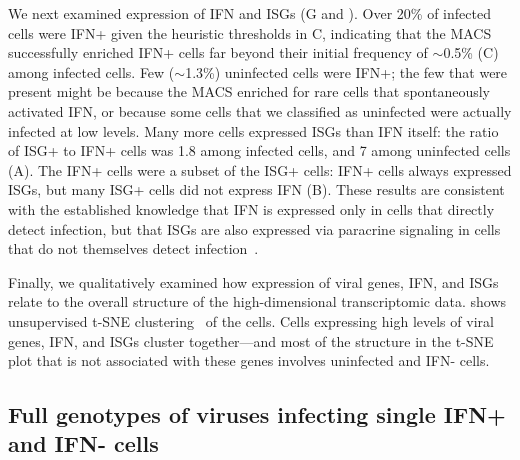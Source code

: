 \documentclass[9pt,lineno]{elife}
\begin{document}
We next examined expression of IFN and ISGs (G and ).
Over 20\% of  infected cells were IFN+ given the heuristic thresholds in C, indicating that the MACS successfully enriched IFN+ cells far beyond their initial frequency of $\sim$0.5\% (C) among infected cells.
Few ($\sim$1.3\%) uninfected cells were IFN+; the few that were present might be because the MACS enriched for rare cells that spontaneously activated IFN, or because some cells that we classified as uninfected were actually infected at low levels.
Many more cells expressed ISGs than IFN itself: the ratio of ISG+ to IFN+ cells was 1.8 among infected cells, and 7 among uninfected cells (A).
The IFN+ cells were a subset of the ISG+ cells: IFN+ cells always expressed ISGs, but many ISG+ cells did not express IFN (B).
These results are consistent with the established knowledge that IFN is expressed only in cells that directly detect infection, but that ISGs are also expressed via paracrine signaling in cells that do not themselves detect infection~\citep{stetson2006type,honda2006type}.

Finally, we qualitatively examined how expression of viral genes, IFN, and ISGs relate to the overall structure of the high-dimensional transcriptomic data.
 shows unsupervised t-SNE clustering~\citep{maaten2008visualizing} of the cells.
Cells expressing high levels of viral genes, IFN, and ISGs cluster together---and most of the structure in the t-SNE plot that is not associated with these genes involves uninfected and IFN- cells.

\subsection{Full genotypes of viruses infecting single IFN+ and IFN- cells}
\end{document}
